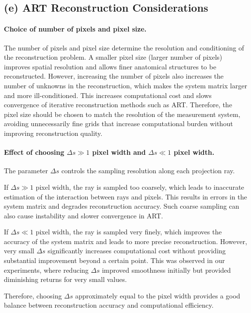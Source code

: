 \documentclass[11pt,a4paper]{article}
\begin{document}
\subsection*{(e) ART Reconstruction Considerations}

\paragraph{Choice of number of pixels and pixel size.}

The number of pixels and pixel size determine the resolution and conditioning of the reconstruction problem. A smaller pixel size (larger number of pixels) improves spatial resolution and allows finer anatomical structures to be reconstructed. However, increasing the number of pixels also increases the number of unknowns in the reconstruction, which makes the system matrix larger and more ill-conditioned. This increases computational cost and slows convergence of iterative reconstruction methods such as ART. Therefore, the pixel size should be chosen to match the resolution of the measurement system, avoiding unnecessarily fine grids that increase computational burden without improving reconstruction quality.

\paragraph{Effect of choosing $\Delta s \gg 1$ pixel width and $\Delta s \ll 1$ pixel width.}

The parameter $\Delta s$ controls the sampling resolution along each projection ray.

If $\Delta s \gg 1$ pixel width, the ray is sampled too coarsely, which leads to inaccurate estimation of the interaction between rays and pixels. This results in errors in the system matrix and degrades reconstruction accuracy. Such coarse sampling can also cause instability and slower convergence in ART.

If $\Delta s \ll 1$ pixel width, the ray is sampled very finely, which improves the accuracy of the system matrix and leads to more precise reconstruction. However, very small $\Delta s$ significantly increases computational cost without providing substantial improvement beyond a certain point. This was observed in our experiments, where reducing $\Delta s$ improved smoothness initially but provided diminishing returns for very small values.

Therefore, choosing $\Delta s$ approximately equal to the pixel width provides a good balance between reconstruction accuracy and computational efficiency.
\end{document}
